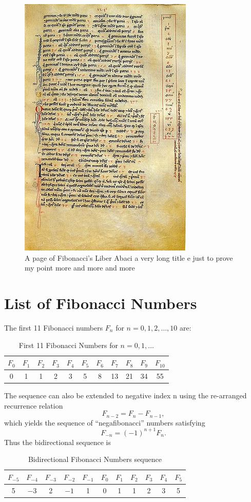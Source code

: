 \begin{figure}[p!]
\centering
\includegraphics[width=.4\textwidth]{314px-Liber-abbaci-magliab-f124r}
\caption{A page of Fibonacci's Liber Abaci a very long title e just to prove my point more and more and more}
\end{figure}

\section{List of Fibonacci Numbers}

The first 11 Fibonacci numbers $F_n$ for $n = 0, 1, 2, \ldots, 10$ are:

\begin{table}[p!]\centering
\caption{First 11 Fibonacci Numbers for $n=0,1,\ldots$}
\begin{tabular}{|c|c|c|c|c|c|c|c|c|c|c|}
\hline
$F_0$ & $F_1$ & $F_2$ & $F_3$ & $F_4$ & $F_5$ & $F_6$ & $F_7$ & $F_8$ & $F_9$ & $F_{10}$\\
\hline
0 & 1 & 1 & 2 & 3 & 5 & 8 & 13 & 21 & 34 & 55 \\
\hline
\end{tabular}
\end{table}

The sequence can also be extended to negative index n using the re-arranged recurrence relation
%
\begin{equation}
F_{n-2} = F_n - F_{n-1},
\end{equation}
%
which yields the sequence of ``negafibonacci'' numbers satisfying
%
\begin{equation}
F_{-n} = (-1)^{n+1} F_n.
\end{equation}
%
Thus the bidirectional sequence is
\begin{table}[p!]\centering
\caption{Bidirectional Fibonacci Numbers sequence}
\begin{tabular}{|c|c|c|c|c|c|c|c|c|c|c|}
\hline
$F_{-5}$ & $F_{-4}$ & $F_{-3}$ & $F_{-2}$ & $F_{-1}$ & $F_0$ & $F_1$ & $F_2$ & $F_3$ & $F_4$ & $F_5$ \\\hline
5 & $-3$ & 2 & $-1$ & 1 & 0 & 1 & 1 & 2 & 3 & 5\\\hline
\end{tabular}
\end{table}

